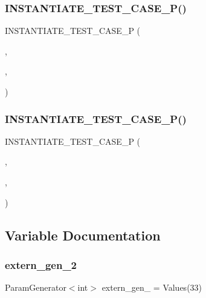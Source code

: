 \subsubsection{\texorpdfstring{INSTANTIATE\_TEST\_CASE\_P()}{INSTANTIATE\_TEST\_CASE\_P()}\hspace{0.1cm}{\footnotesize\ttfamily [1/2]}}
{\footnotesize\ttfamily I\+N\+S\+T\+A\+N\+T\+I\+A\+T\+E\+\_\+\+T\+E\+S\+T\+\_\+\+C\+A\+S\+E\+\_\+P (\begin{DoxyParamCaption}\item[{Multiples\+Of33}]{,  }\item[{\mbox{\hyperlink{classExternalInstantiationTest}{External\+Instantiation\+Test}}}]{,  }\item[{Values(33, 66)}]{ }\end{DoxyParamCaption})}

\mbox{\label{googletest-test2__test_8cc_a06b097d2f2746a785ab07df0cc2e80a2}} 
\subsubsection{\texorpdfstring{INSTANTIATE\_TEST\_CASE\_P()}{INSTANTIATE\_TEST\_CASE\_P()}\hspace{0.1cm}{\footnotesize\ttfamily [2/2]}}
{\footnotesize\ttfamily I\+N\+S\+T\+A\+N\+T\+I\+A\+T\+E\+\_\+\+T\+E\+S\+T\+\_\+\+C\+A\+S\+E\+\_\+P (\begin{DoxyParamCaption}\item[{Sequence2}]{,  }\item[{\mbox{\hyperlink{classInstantiationInMultipleTranslaionUnitsTest}{Instantiation\+In\+Multiple\+Translaion\+Units\+Test}}}]{,  }\item[{Values(42 $\ast$3, 42 $\ast$4, 42 $\ast$5)}]{ }\end{DoxyParamCaption})}



\subsection{Variable Documentation}
\mbox{\label{googletest-test2__test_8cc_a4c9bff52d70a57c0563599a919c33bc9}} 
\subsubsection{\texorpdfstring{extern\_gen\_2}{extern\_gen\_2}}
{\footnotesize\ttfamily Param\+Generator$<$int$>$ extern\+\_\+gen\+\_ = Values(33)}

